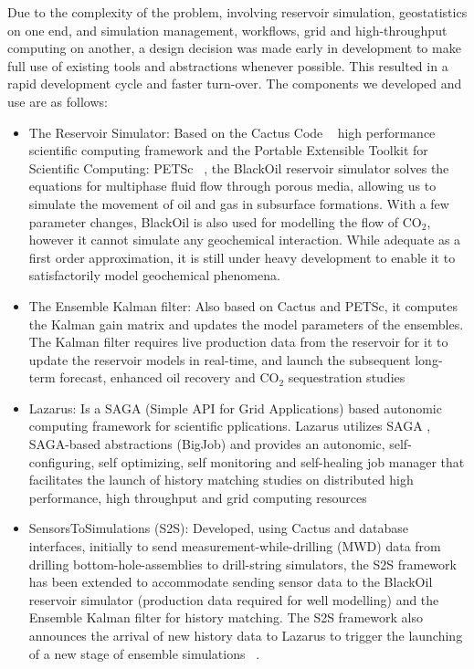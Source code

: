 \documentclass[conference,final]{IEEEtran}
\begin{document}
Due to the complexity of the problem, involving reservoir simulation, geostatistics on one 
end, and simulation management, workflows, grid and high-throughput computing on another, 
a design decision was made early in development to make full use of existing tools and 
abstractions whenever possible. This resulted in a rapid development cycle and faster 
turn-over. The components we developed and use are as follows:

\begin{itemize}
\item The Reservoir Simulator: Based on the Cactus Code ~\cite{cactus_web} high 
performance scientific computing framework and the Portable Extensible Toolkit for 
Scientific Computing: PETSc ~\cite{PETSc}, the BlackOil reservoir simulator solves the 
equations for multiphase fluid flow through porous media, allowing us to simulate the 
movement of oil and gas in subsurface formations. With a few parameter changes, BlackOil 
is also used for modelling the flow of CO$_2$, however it cannot 
simulate any geochemical interaction. While adequate as a first order approximation, it is 
still under heavy development to enable it to satisfactorily model geochemical phenomena.

\item The Ensemble Kalman filter: Also based on Cactus and PETSc, it computes the Kalman 
gain matrix and updates the model parameters of the ensembles. The Kalman filter requires 
live production data from the reservoir for it to update the reservoir models in 
real-time, and launch the subsequent long-term forecast, enhanced oil recovery and CO$_2$ 
sequestration studies

\item Lazarus: Is a SAGA (Simple API for Grid Applications) based autonomic computing 
framework for scientific pplications. Lazarus utilizes SAGA , SAGA-based 
abstractions (BigJob) and provides an autonomic, self-configuring, self optimizing, self 
monitoring and self-healing job manager that facilitates the launch of history matching 
studies on distributed high performance, high throughput and grid computing resources 
~\cite{gmac}

\item SensorsToSimulations (S2S): Developed, using Cactus and database interfaces, 
initially to send measurement-while-drilling (MWD) data from drilling 
bottom-hole-assemblies to drill-string simulators, the S2S framework has been extended to 
accommodate sending sensor data to the BlackOil reservoir simulator (production data 
required for well modelling) and the Ensemble Kalman filter for history matching. The S2S 
framework also announces the arrival of new history data to Lazarus to trigger the 
launching of a new stage of ensemble simulations ~\cite{Duff1,Duff2}.

\end{itemize}
\end{document}
